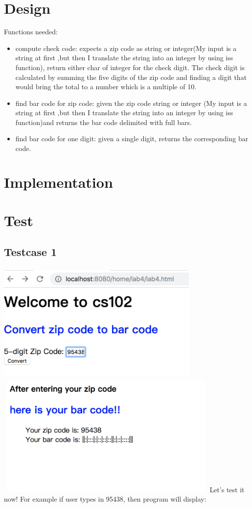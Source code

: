\documentclass{article}
\begin{document}
\newpage\section*{Design}
Functions needed:
\begin{itemize}
	\item compute check code: expects a zip code as string or integer(My input is a string at first ,but then I translate the string into an integer by using iss function), return either char of integer for the check digit.
	 The check digit is calculated by summing the five digits of the zip code and finding a digit that would bring the total to a number which is a multiple of 10.
	\item find bar code for zip code: given the zip code string or 
	integer (My input is a string at first ,but then I translate the string into an integer by using iss function)and returns the bar code delimited with full bars.
	\item find bar code for one digit: given a single digit, returns 
	the corresponding bar code.
\end{itemize}
\newpage\section*{Implementation}


\newpage\section*{Test}
\subsection*{Testcase 1}
\includegraphics[width = 10cm, height = 6cm]{1.png}
\includegraphics[width = 11cm, height = 6cm]{5.png}
Let's test it now! For example if user types in 95438, then program will display:
\end{document}
